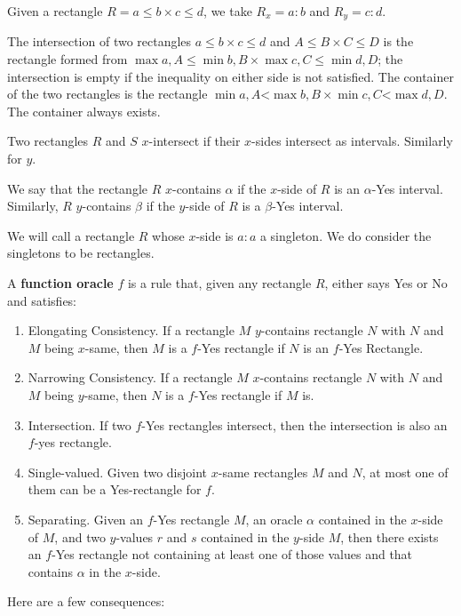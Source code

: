 \documentclass[12pt]{article}
\theoremstyle{remark}
\newcommand{\lt}{\mathord{<}}
\begin{document}
Given a rectangle $R = a \leq b \times c \leq d$, we take $R_x = a:b$ and $R_y = c:d$. 

The intersection of two rectangles $a \leq b \times c \leq d$ and $A \leq B \times C \leq D$ is the rectangle formed from $\max{a,A} \leq \min{b,B} \times \max{c, C} \leq \min{d, D}$; the intersection is empty if the inequality on either side is not satisfied. The container of the two rectangles is the rectangle $\min{a,A} \lt \max{b,B} \times \min{c, C} \lt \max{d, D}$. The container always exists. 

Two rectangles $R$ and $S$ $x$-intersect if their $x$-sides intersect as intervals. Similarly for $y$. 

We say that the rectangle $R$ $x$-contains $\alpha$ if the $x$-side of $R$ is an $\alpha$-Yes interval. Similarly, $R$ $y$-contains $\beta$ if the $y$-side of $R$ is a $\beta$-Yes interval.

We will call a rectangle $R$ whose $x$-side is $a:a$ a singleton. We do consider the singletons to be rectangles.

A \textbf{function oracle} $f$ is a rule that, given any rectangle $R$, either says Yes or No and satisfies: 
\begin{enumerate}
    \item Elongating Consistency. If a rectangle $M$ $y$-contains rectangle $N$ with $N$ and $M$ being $x$-same, then $M$ is a $f$-Yes rectangle if $N$  is an $f$-Yes Rectangle. 
    \item Narrowing Consistency. If a rectangle $M$ $x$-contains rectangle $N$ with $N$ and $M$ being $y$-same, then $N$ is a $f$-Yes rectangle if $M$ is. 
    \item Intersection. If two $f$-Yes rectangles intersect, then the intersection is also an $f$-yes rectangle. 
    \item Single-valued. Given two disjoint $x$-same rectangles $M$ and $N$, at most one of them can be a Yes-rectangle for $f$. 
    \item Separating. Given an $f$-Yes rectangle $M$, an oracle $\alpha$ contained in the $x$-side of $M$, and two $y$-values $r$ and $s$ contained in the $y$-side $M$, then there exists an $f$-Yes rectangle not containing at least one of those values and that contains $\alpha$ in the $x$-side.
\end{enumerate} 

Here are a few consequences: 
\end{document}
